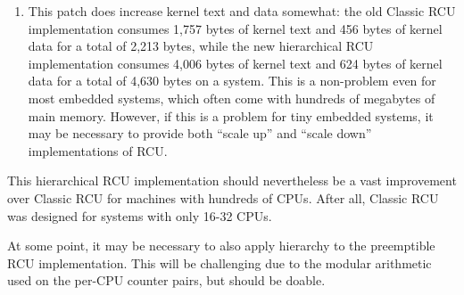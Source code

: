 \begin{enumerate}
\item	This patch does increase kernel text and data somewhat:
	the old Classic RCU implementation consumes 1,757 bytes of
	kernel text and 456 bytes of kernel data for a total of 2,213 bytes,
	while the new hierarchical RCU implementation consumes 4,006
	bytes of kernel text and 624 bytes of kernel data for a total
	of 4,630 bytes on a  system.
	This is a non-problem even for most embedded systems, which
	often come with hundreds of megabytes of main memory.
	However, if this is a problem for tiny embedded systems, it may
	be necessary to provide both ``scale up'' and
	``scale down'' implementations of RCU.
\end{enumerate}

This hierarchical RCU implementation should nevertheless be a vast
improvement over Classic RCU for machines with hundreds of CPUs.
After all, Classic RCU was designed for systems with only 16-32 CPUs.

At some point, it may be necessary to also apply hierarchy to the
preemptible RCU implementation.
This will be challenging due to the modular arithmetic used on the
per-CPU counter pairs, but should be doable.
